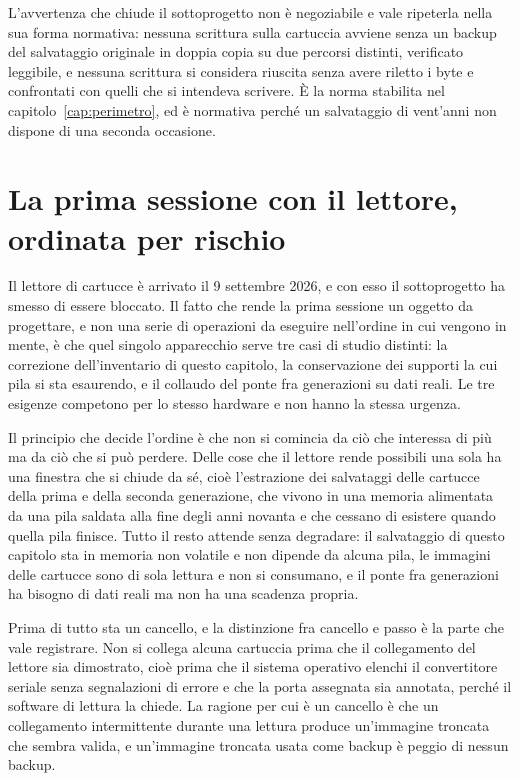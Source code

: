 L'avvertenza che chiude il sottoprogetto non è negoziabile e vale ripeterla nella sua forma normativa: nessuna scrittura sulla cartuccia avviene senza un backup del salvataggio originale in doppia copia su due percorsi distinti, verificato leggibile, e nessuna scrittura si considera riuscita senza avere riletto i byte e confrontati con quelli che si intendeva scrivere. È la norma stabilita nel capitolo~\ref{cap:perimetro}, ed è normativa perché un salvataggio di vent'anni non dispone di una seconda occasione.

\section{La prima sessione con il lettore, ordinata per rischio}

Il lettore di cartucce è arrivato il 9 settembre 2026, e con esso il sottoprogetto ha smesso di essere bloccato. Il fatto che rende la prima sessione un oggetto da progettare, e non una serie di operazioni da eseguire nell'ordine in cui vengono in mente, è che quel singolo apparecchio serve tre casi di studio distinti: la correzione dell'inventario di questo capitolo, la conservazione dei supporti la cui pila si sta esaurendo, e il collaudo del ponte fra generazioni su dati reali. Le tre esigenze competono per lo stesso hardware e non hanno la stessa urgenza.

Il principio che decide l'ordine è che non si comincia da ciò che interessa di più ma da ciò che si può perdere. Delle cose che il lettore rende possibili una sola ha una finestra che si chiude da sé, cioè l'estrazione dei salvataggi delle cartucce della prima e della seconda generazione, che vivono in una memoria alimentata da una pila saldata alla fine degli anni novanta e che cessano di esistere quando quella pila finisce. Tutto il resto attende senza degradare: il salvataggio di questo capitolo sta in memoria non volatile e non dipende da alcuna pila, le immagini delle cartucce sono di sola lettura e non si consumano, e il ponte fra generazioni ha bisogno di dati reali ma non ha una scadenza propria.

Prima di tutto sta un cancello, e la distinzione fra cancello e passo è la parte che vale registrare. Non si collega alcuna cartuccia prima che il collegamento del lettore sia dimostrato, cioè prima che il sistema operativo elenchi il convertitore seriale senza segnalazioni di errore e che la porta assegnata sia annotata, perché il software di lettura la chiede. La ragione per cui è un cancello è che un collegamento intermittente durante una lettura produce un'immagine troncata che sembra valida, e un'immagine troncata usata come backup è peggio di nessun backup.

